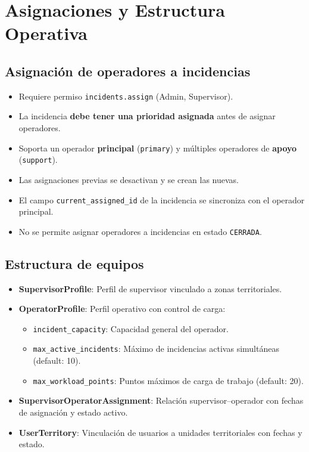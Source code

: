\documentclass[11pt, a4paper]{article}
\begin{document}
\section{Asignaciones y Estructura Operativa}

\subsection{Asignación de operadores a incidencias}

\begin{reglanegocio}
\begin{itemize}
  \item Requiere permiso \texttt{incidents.assign} (Admin, Supervisor).
  \item La incidencia \textbf{debe tener una prioridad asignada} antes de asignar operadores.
  \item Soporta un operador \textbf{principal} (\texttt{primary}) y múltiples operadores de \textbf{apoyo} (\texttt{support}).
  \item Las asignaciones previas se desactivan y se crean las nuevas.
  \item El campo \texttt{current\_assigned\_id} de la incidencia se sincroniza con el operador principal.
  \item No se permite asignar operadores a incidencias en estado \texttt{CERRADA}.
\end{itemize}
\end{reglanegocio}

\subsection{Estructura de equipos}

\begin{itemize}
  \item \textbf{SupervisorProfile}: Perfil de supervisor vinculado a zonas territoriales.
  \item \textbf{OperatorProfile}: Perfil operativo con control de carga:
  \begin{itemize}
    \item \texttt{incident\_capacity}: Capacidad general del operador.
    \item \texttt{max\_active\_incidents}: Máximo de incidencias activas simultáneas (default: 10).
    \item \texttt{max\_workload\_points}: Puntos máximos de carga de trabajo (default: 20).
  \end{itemize}
  \item \textbf{SupervisorOperatorAssignment}: Relación supervisor--operador con fechas de asignación y estado activo.
  \item \textbf{UserTerritory}: Vinculación de usuarios a unidades territoriales con fechas y estado.
\end{itemize}
\end{document}
